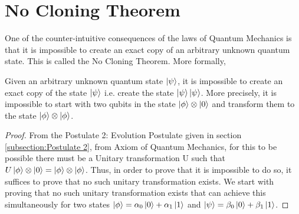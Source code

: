 \section{No Cloning Theorem}
One of the counter-intuitive consequences of the laws of Quantum Mechanics is that 
it is impossible to create an exact copy of an arbitrary unknown quantum state. This is called the No Cloning Theorem.
More formally, 
\begin{theorem}
    Given an arbitrary unknown quantum state $\ket{\psi}$, it is impossible to create an exact copy of the state $\ket{\psi}$
    i.e. create the state $\ket{\psi}\ket{\psi}$. More precisely, it is impossible to start with two qubits in the state $\ket{\phi} \otimes \ket{0}$ and transform them to the state $\ket{\phi} \otimes \ket{\phi}$.
\end{theorem}
\begin{proof}
    From the Postulate 2: Evolution Postulate given in section \ref{subsection:Postulate 2}, from Axiom of Quantum Mechanics, for this to be possible there must be a Unitary transformation U such that $U\ket{\phi}\otimes \ket{0} = \ket{\phi}\otimes \ket{\phi}$. Thus, in order to prove that it is impossible to do so, it suffices to prove that no such unitary transformation exists. We start with proving that no such unitary transformation exists that can achieve this simultaneously for two states $\ket{\phi}=\alpha_0\ket{0}+\alpha_1\ket{1}$ and $\ket{\psi}=\beta_0\ket{0}+\beta_1\ket{1}$.


\end{proof}
